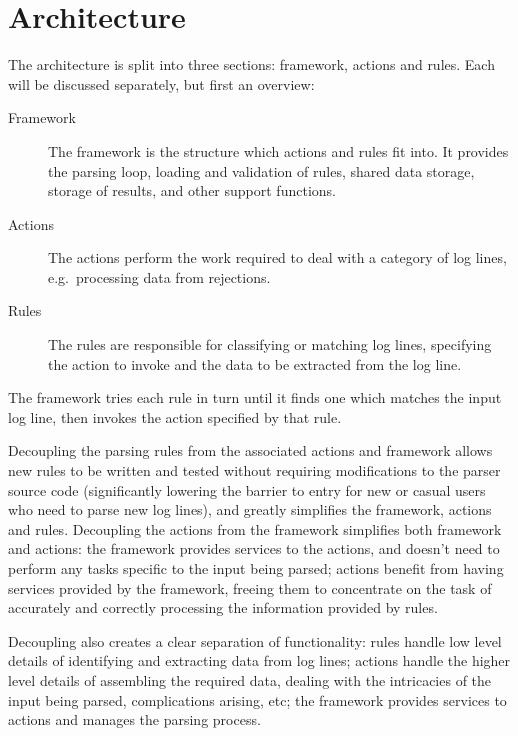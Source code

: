 \documentclass[draft]{svmult}
\begin{document}
\section{Architecture}

\label{Architecture}

The architecture is split into three sections: framework, actions and
rules.  Each will be discussed separately, but first an overview:

\begin{description}

    \item [Framework]  The framework is the structure which actions and
        rules fit into.  It provides the parsing loop, loading and
        validation of rules, shared data storage, storage of results, and
        other support functions.

    \item [Actions]  The actions perform the work required to deal with a
        category of log lines, e.g.\ processing data from rejections.

    \item [Rules]  The rules are responsible for classifying or matching
        log lines, specifying the action to invoke and the data to be
        extracted from the log line.

\end{description}

The framework tries each rule in turn until it finds one which matches the
input log line, then invokes the action specified by that rule.

Decoupling the parsing rules from the associated actions and framework
allows new rules to be written and tested without requiring modifications
to the parser source code (significantly lowering the barrier to entry for
new or casual users who need to parse new log lines), and greatly
simplifies the framework, actions and rules. Decoupling the actions from
the framework simplifies both framework and actions: the framework provides
services to the actions, and doesn't need to perform any tasks specific to
the input being parsed; actions benefit from having services provided by
the framework, freeing them to concentrate on the task of accurately and
correctly processing the information provided by rules.

Decoupling also creates a clear separation of functionality: rules handle
low level details of identifying and extracting data from log lines;
actions handle the higher level details of assembling the required data,
dealing with the intricacies of the input being parsed, complications
arising, etc; the framework provides services to actions and manages the
parsing process.
\end{document}
